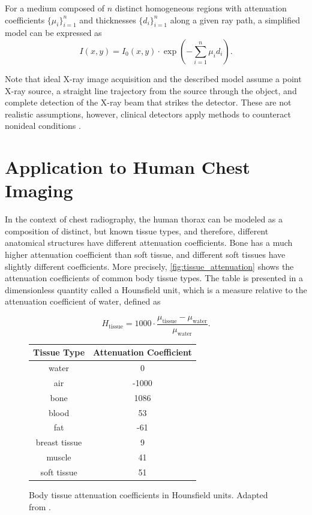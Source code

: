\documentclass[nomenclature, english, bibtex]{kththesis}
\numberwithin{listing}{chapter}
\begin{document}
For a medium composed of $n$ distinct homogeneous regions with attenuation coefficients
$\{\mu_i\}_{i=1}^n$ and thicknesses $\{d_i\}_{i=1}^n$ along a given ray path,
a simplified model can be expressed as
\begin{equation}
    I(x,y) = I_0(x,y) \cdot \exp\left(-\sum_{i=1}^n \mu_i d_i\right).
    \label{eq:discrete_materials}
\end{equation}

Note that ideal X-ray image acquisition and the described model assume a point X-ray source, a straight line
trajectory from the source through the object, and complete detection of the X-ray beam that strikes the detector.
These are not realistic assumptions, however, clinical detectors apply methods to counteract nonideal conditions
\cite[p.~9]{Seibert3}.

\section{Application to Human Chest Imaging}
\label{sec:human_chest_imaging}

In the context of chest radiography, the human thorax can be modeled as a composition of distinct, but
known tissue types, and therefore, different anatomical structures have different attenuation coefficients.
Bone has a much higher attenuation coefficient than soft tissue, and different soft tissues have slightly
different coefficients. More precisely, \autoref{fig:tissue_attenuation} shows the attenuation coefficients
of common body tissue types. The table is presented in a dimensionless quantity called a
Hounsfield unit, which is a measure relative to the attenuation coefficient of water, defined as
\cite[p.~54]{epstein2008}

\begin{equation}
    H_{\text{tissue}} = 1000 \cdot \frac{\mu_{\text{tissue}} − \mu_{\text{water}}}{\mu_{\text{water}}}.
\end{equation}

\begin{figure}[H]
    \centering
    \begin{tabular}{|c|c|}
        \hline
        Tissue Type & Attenuation Coefficient \\
        \hline
        water & 0 \\
        \hline
        air & -1000 \\
        \hline
        bone & 1086 \\
        \hline
        blood & 53 \\
        \hline
        fat & -61 \\
        \hline
        breast tissue & 9 \\
        \hline
        muscle & 41 \\
        \hline
        soft tissue & 51 \\
        \hline
    \end{tabular}
    \caption{Body tissue attenuation coefficients in Hounsfield units. Adapted from \cite[p.~54]{epstein2008}.}
    \label{fig:tissue_attenuation}
\end{figure}
\end{document}
